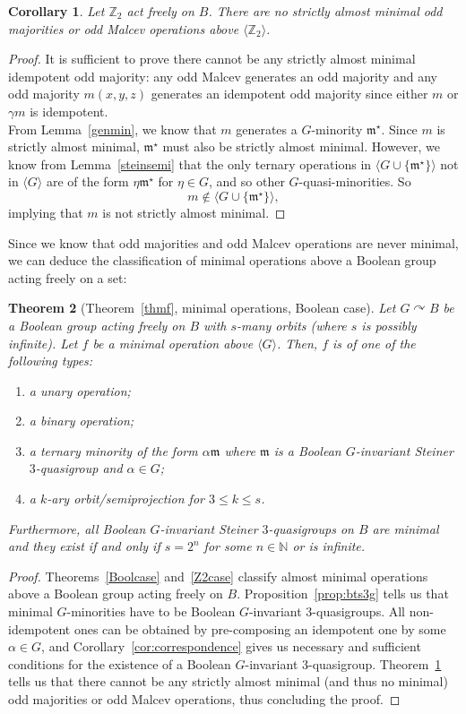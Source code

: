 \documentclass{article}
\newtheorem{theorem}{Theorem}[section]
\newtheorem{corollary}[theorem]{Corollary}
\theoremstyle{remark}
\theoremstyle{definition}
\def\acts{\curvearrowright}
\begin{document}
\begin{corollary}\label{nominmaj} Let $\mathbb{Z}_2$ act freely on $B$. There are no strictly almost minimal odd majorities or odd Malcev operations above $\langle \mathbb{Z}_2\rangle$.
\end{corollary}
\begin{proof} It is sufficient to prove there cannot be any strictly almost minimal idempotent odd majority: any odd Malcev generates an odd majority and any odd majority $m(x,y,z)$ generates an idempotent odd majority since either $m$ or $\gamma m$ is idempotent.\\
From Lemma~\ref{genmin}, we know that $m$ generates a $G$-minority $\mathfrak{m}^\star$. Since $m$ is strictly almost minimal, $\mathfrak{m}^\star$ must also be strictly almost minimal. However, we know from Lemma~\ref{steinsemi} that the only ternary operations in $\langle G \cup\{\mathfrak{m}^\star\}\rangle$ not in $\langle G \rangle$ are of the form $\eta\mathfrak{m}^\star$ for $\eta\in G$, and so other $G$-quasi-minorities. So
\[m\not\in\langle G\cup\{\mathfrak{m}^\star\}\rangle,\]
implying that $m$ is not strictly almost minimal.
\end{proof}


Since we know that odd majorities and odd Malcev operations are never minimal, we can deduce the classification of minimal operations above a Boolean group acting freely on a set:

\begin{theorem}[Theorem~\ref{thmf}, minimal operations, Boolean case]\label{Boolminclass} Let $G\acts B$ be a Boolean group acting freely on $B$ with $s$-many orbits (where $s$ is possibly infinite). Let $f$ be a minimal operation above $\langle G \rangle$. Then,  $f$ is of one of the following types:
\begin{enumerate}
    \item a unary operation;
    \item a binary operation;
    \item a ternary minority of the form $\alpha \mathfrak{m}$ where $\mathfrak{m}$ is a Boolean $G$-invariant Steiner $3$-quasigroup and $\alpha\in G$;
    \item a $k$-ary orbit\-/semiprojection for $3\leq k \leq s$.
\end{enumerate} 
Furthermore, all Boolean $G$-invariant Steiner $3$-quasigroups on $B$ are minimal and they exist if and only if $s=2^n$ for some $n\in\mathbb{N}$ or is infinite.
\end{theorem}
\begin{proof} Theorems~\ref{Boolcase} and~\ref{Z2case} classify almost minimal operations above a Boolean group acting freely on $B$. Proposition~\ref{prop:bts3g} tells us that minimal $G$-minorities have to be Boolean $G$-invariant $3$-quasigroups. All non-idempotent ones can be obtained by pre-composing an idempotent one by some $\alpha\in G$, and Corollary~\ref{cor:correspondence} gives us necessary and sufficient conditions for the existence of a Boolean $G$-invariant $3$-quasigroup. Theorem~\ref{nominmaj} tells us that there cannot be any strictly almost minimal (and thus no minimal) odd majorities or odd Malcev operations, thus concluding the proof.
\end{proof}
\end{document}
